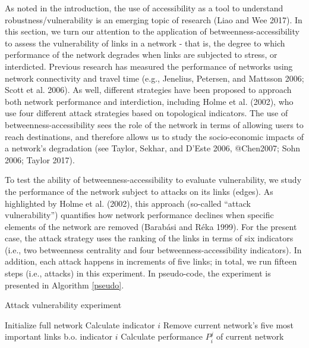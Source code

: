 \documentclass[]{elsarticle} %
\begin{document}
As noted in the introduction, the use of accessibility as a tool to
understand robustness/vulnerability is an emerging topic of research
(Liao and Wee 2017). In this section, we turn our attention to the
application of betweenness-accessibility to assess the vulnerability of
links in a network - that is, the degree to which performance of the
network degrades when links are subjected to stress, or interdicted.
Previous research has measured the performance of networks using network
connectivity and travel time (e.g., Jenelius, Petersen, and Mattsson
2006; Scott et al. 2006). As well, different strategies have been
proposed to approach both network performance and interdiction,
including Holme et al. (2002), who use four different attack strategies
based on topological indicators. The use of betweenness-accessibility
sees the role of the network in terms of allowing users to reach
destinations, and therefore allows us to study the socio-economic
impacts of a network's degradation (see Taylor, Sekhar, and D'Este 2006,
@Chen2007; Sohn 2006; Taylor 2017).

To test the ability of betweenness-accessibility to evaluate
vulnerability, we study the performance of the network subject to
attacks on its links (edges). As highlighted by Holme et al. (2002),
this approach (so-called ``attack vulnerability'') quantifies how
network performance declines when specific elements of the network are
removed (Barabási and Réka 1999). For the present case, the attack
strategy uses the ranking of the links in terms of six indicators (i.e.,
two betweenness centrality and four betweenness-accessibility
indicators). In addition, each attack happens in increments of five
links; in total, we run fifteen steps (i.e., attacks) in this
experiment. In pseudo-code, the experiment is presented in Algorithm
\ref{pseudo}.

\begin{algorithm}
\caption{Attack vulnerability experiment}
\begin{algorithmic}[1]
\State Initialize full network
\State Calculate indicator $i$ 
\State Remove current network's five most important links b.o. indicator $i$
\State Calculate performance $P_i^j$ of current network
\EndFor
\EndFor
\end{algorithmic}
\label{pseudo}
\end{algorithm}
\end{document}
